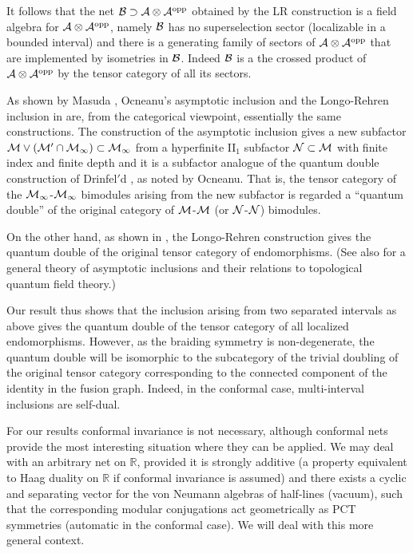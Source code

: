 \documentclass[12pt]{article}
\def\A{{\cal A}}
\def\B{{\cal B}}
\def\N{{\cal N}}
\def\M{{\cal M}}
\def\R{{\mathbb R}}
\def\AA{{\A\otimes \A^{\rm opp}}}
\begin{document}
It follows that the net $\B\supset\AA$ obtained by the LR construction
is a field algebra for $\AA$, namely $\B$ has no superselection sector
(localizable in a bounded interval) and there is a generating family
of sectors of $\AA$ that are implemented by  isometries in $\B$.
Indeed $\B$ is a the crossed product of $\AA$ by the tensor category of
all its sectors.

As shown by Masuda \cite{Ma},
Ocneanu's asymptotic inclusion \cite{O2}  and
the Longo-Rehren
inclusion in \cite{LR} are, from the categorical viewpoint,
essentially the same constructions. The construction of the asymptotic
inclusion gives a new subfactor
$\M\vee (\M'\cap \M_\infty)\subset \M_\infty$ from a hyperfinite
II$_1$ subfactor $\N\subset \M$ with finite index and finite
depth and it is a subfactor analogue of the quantum
double construction of Drinfel$'$d \cite{D}, as noted
by Ocneanu.  That is, the tensor category of the $\M_\infty$-$\M_\infty$
bimodules arising from the new subfactor is regarded a ``quantum
double'' of the original category of $\M$-$\M$ (or $\N$-$\N$) bimodules.

On the other hand, as shown in \cite{Mu3}, the Longo-Rehren
construction gives the quantum double of the original tensor category
of endomorphisms.
(See also \cite[Chapter 12]{EK2}
for a general theory of asymptotic inclusions and their
relations to topological quantum field theory.)

Our result thus shows that the inclusion
arising from two separated intervals as
above gives the quantum double of the tensor category of all
localized endomorphisms.
However, as the braiding symmetry is non-degenerate, the quantum
double will be isomorphic to the subcategory of the trivial doubling of
the original tensor category corresponding to the connected
component of the identity in the fusion graph. Indeed, in the conformal case,
multi-interval inclusions are self-dual.

For our results conformal invariance is not necessary, although
conformal nets provide the most interesting situation where they can
be applied. We may deal with an arbitrary net
on $\R$, provided it is strongly additive (a property equivalent to
Haag duality on $\R$ if conformal invariance is assumed) and there
exists a cyclic and separating vector for the von Neumann
algebras of half-lines (vacuum), such that the  corresponding
modular conjugations act geometrically as PCT symmetries
(automatic in the conformal case). We will deal with this more general
context.
\end{document}
